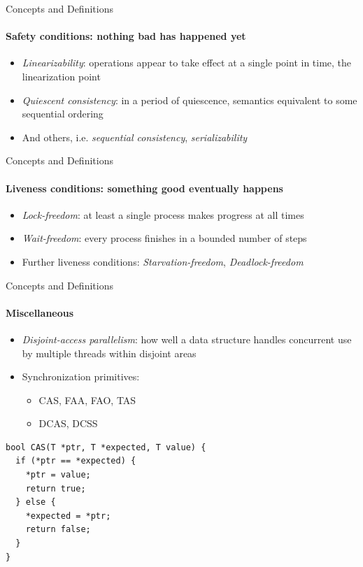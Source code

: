 \documentclass[usenames,dvipsnames]{beamer}
\begin{document}
\begin{frame}{Concepts and Definitions}
\framesubtitle{Safety conditions: nothing bad has happened yet}

\begin{itemize}
\item \emph{Linearizability}: operations appear to take effect at a single point in time, the linearization point
\item \emph{Quiescent consistency}: in a period of quiescence, semantics equivalent to some sequential ordering
\item And others, i.e. \emph{sequential consistency}, \emph{serializability}
\end{itemize}
\end{frame}

\begin{frame}{Concepts and Definitions}
\framesubtitle{Liveness conditions: something good eventually happens}

\begin{itemize}
\item \emph{Lock-freedom}: at least a single process makes progress at all times
\item \emph{Wait-freedom}: every process finishes in a bounded number of steps
\item Further liveness conditions: \emph{Starvation-freedom}, \emph{Deadlock-freedom}
\end{itemize}
\end{frame}

\begin{frame}[fragile]{Concepts and Definitions}
\framesubtitle{Miscellaneous}

\begin{itemize}
\item \emph{Disjoint-access parallelism}: how well a data structure handles concurrent use by multiple
      threads within disjoint areas
\item Synchronization primitives:
    \begin{itemize}
    \item \ac{CAS}, \ac{FAA}, \ac{FAO}, \ac{TAS}
    \item \ac{DCAS}, \ac{DCSS}
    \end{itemize}
\end{itemize}

\begin{lstlisting}
bool CAS(T *ptr, T *expected, T value) {
  if (*ptr == *expected) {
    *ptr = value;
    return true;
  } else {
    *expected = *ptr;
    return false;
  }
}
\end{lstlisting}


\end{frame}
\end{document}
